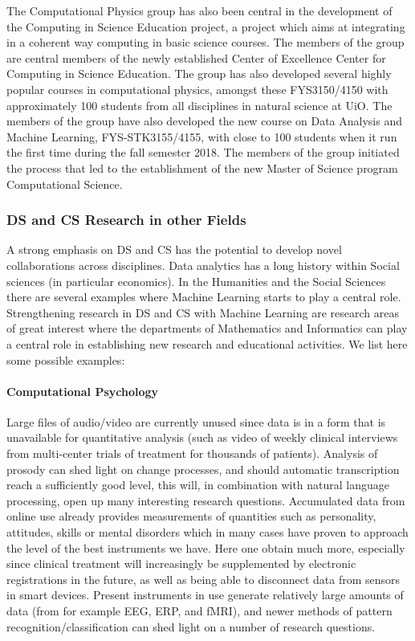 \documentclass[a4paper,10pt]{article}
\begin{document}
The Computational Physics group has also been central in the development of the Computing in Science Education project, a project which aims at integrating in a coherent way computing in basic science courses. The members of the group are central members of the newly established Center of Excellence Center for Computing in Science Education. 
The group has also developed several highly popular courses in computational physics, amongst these FYS3150/4150 with approximately 100 students from all disciplines in natural science at UiO. The members of the group have also developed the new course on Data Analysis and Machine Learning, FYS-STK3155/4155, with close to 100 students when it run the first time during the fall semester 2018. The members of the group initiated the process that led to the establishment of the new Master of Science program Computational Science. 



\subsubsection*{DS and CS Research in other Fields}

A strong emphasis on DS and CS has the potential to develop novel collaborations across disciplines. Data analytics has a long history within Social sciences (in particular economics). In the Humanities and the Social Sciences there are several examples where Machine Learning starts to play a central role. Strengthening research in DS and CS with Machine Learning are research areas of great interest where the departments of Mathematics and Informatics can play a central role in establishing new research and educational activities. We list here some possible examples:


\paragraph{Computational Psychology}
Large files of audio/video are currently unused since data is in a form that is unavailable for quantitative analysis (such as video of weekly clinical interviews from multi-center trials of treatment for thousands of patients). Analysis of prosody can shed light on change processes, and should automatic transcription reach a sufficiently good level, this will, in combination with natural language processing, open up many interesting research questions.
Accumulated data from online use already provides measurements of quantities such as personality, attitudes, skills or mental disorders which in many cases have proven to approach the level of the best instruments we have. Here one obtain much more, especially since clinical treatment will increasingly be supplemented by electronic registrations in the future, as well as being able to disconnect data from sensors in smart devices. Present instruments in use generate relatively large amounts of data (from for example EEG, ERP, and fMRI), and newer methods of pattern recognition/classification can shed light on a number of research questions.
\end{document}
